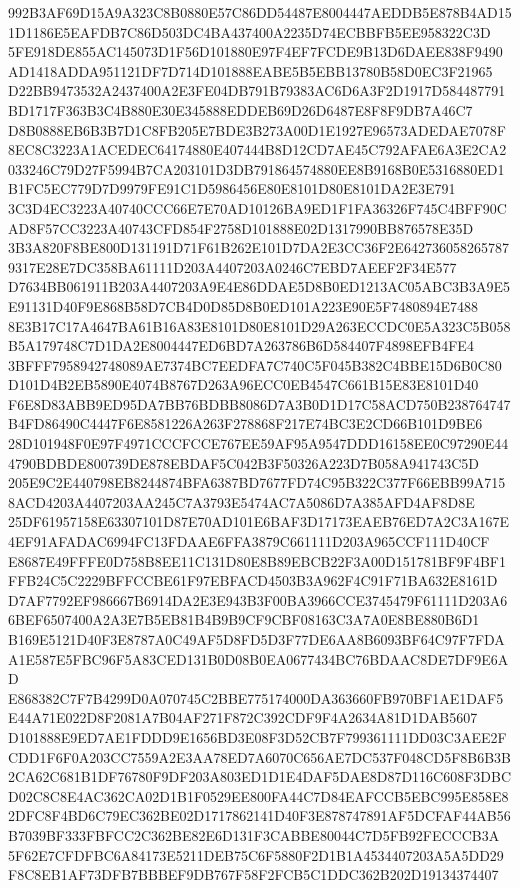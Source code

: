 \documentclass[UTF8,fontset=fandol,zihao=-4,a4paper]{ctexart}
\begin{document}
{{992B3AF69D15A9A323C8B0880E57C86DD54487E8004447AEDDB5E878B4AD151D1186E5EAFDB7C86D503DC4BA437400A2235D74ECBBFB5EE958322C3D
5FE918DE855AC145073D1F56D101880E97F4EF7FCDE9B13D6DAEE838F9490AD1418ADDA951121DF7D714D101888EABE5B5EBB13780B58D0EC3F21965
D22BB9473532A2437400A2E3FE04DB791B79383AC6D6A3F2D1917D584487791BD1717F363B3C4B880E30E345888EDDEB69D26D6487E8F8F9DB7A46C7
D8B0888EB6B3B7D1C8FB205E7BDE3B273A00D1E1927E96573ADEDAE7078F8EC8C3223A1ACEDEC64174880E407444B8D12CD7AE45C792AFAE6A3E2CA2
033246C79D27F5994B7CA203101D3DB791864574880EE8B9168B0E5316880ED1B1FC5EC779D7D9979FE91C1D5986456E80E8101D80E8101DA2E3E791
3C3D4EC3223A40740CCC66E7E70AD10126BA9ED1F1FA36326F745C4BFF90CAD8F57CC3223A40743CFD854F2758D101888E02D1317990BB876578E35D
3B3A820F8BE800D131191D71F61B262E101D7DA2E3CC36F2E6427360582657879317E28E7DC358BA61111D203A4407203A0246C7EBD7AEEF2F34E577
D7634BB061911B203A4407203A9E4E86DDAE5D8B0ED1213AC05ABC3B3A9E5E91131D40F9E868B58D7CB4D0D85D8B0ED101A223E90E5F7480894E7488
8E3B17C17A4647BA61B16A83E8101D80E8101D29A263ECCDC0E5A323C5B058B5A179748C7D1DA2E8004447ED6BD7A263786B6D584407F4898EFB4FE4
3BFFF7958942748089AE7374BC7EEDFA7C740C5F045B382C4BBE15D6B0C80D101D4B2EB5890E4074B8767D263A96ECC0EB4547C661B15E83E8101D40
F6E8D83ABB9ED95DA7BB76BDBB8086D7A3B0D1D17C58ACD750B238764747B4FD86490C4447F6E8581226A263F278868F217E74BC3E2CD66B101D9BE6
28D101948F0E97F4971CCCFCCE767EE59AF95A9547DDD16158EE0C97290E444790BDBDE800739DE878EBDAF5C042B3F50326A223D7B058A941743C5D
205E9C2E440798EB8244874BFA6387BD7677FD74C95B322C377F66EBB99A7158ACD4203A4407203AA245C7A3793E5474AC7A5086D7A385AFD4AF8D8E
25DF61957158E63307101D87E70AD101E6BAF3D17173EAEB76ED7A2C3A167E4EF91AFADAC6994FC13FDAAE6FFA3879C661111D203A965CCF111D40CF
E8687E49FFFE0D758B8EE11C131D80E8B89EBCB22F3A00D151781BF9F4BF1FFB24C5C2229BFFCCBE61F97EBFACD4503B3A962F4C91F71BA632E8161D
D7AF7792EF986667B6914DA2E3E943B3F00BA3966CCE3745479F61111D203A66BEF6507400A2A3E7B5EB81B4B9B9CF9CBF08163C3A7A0E8BE880B6D1
B169E5121D40F3E8787A0C49AF5D8FD5D3F77DE6AA8B6093BF64C97F7FDAA1E587E5FBC96F5A83CED131B0D08B0EA0677434BC76BDAAC8DE7DF9E6AD
E868382C7F7B4299D0A070745C2BBE775174000DA363660FB970BF1AE1DAF5E44A71E022D8F2081A7B04AF271F872C392CDF9F4A2634A81D1DAB5607
D101888E9ED7AE1FDDD9E1656BD3E08F3D52CB7F799361111DD03C3AEE2FCDD1F6F0A203CC7559A2E3AA78ED7A6070C656AE7DC537F048CD5F8B6B3B
2CA62C681B1DF76780F9DF203A803ED1D1E4DAF5DAE8D87D116C608F3DBCD02C8C8E4AC362CA02D1B1F0529EE800FA44C7D84EAFCCB5EBC995E858E8
2DFC8F4BD6C79EC362BE02D1717862141D40F3E878747891AF5DCFAF44AB56B7039BF333FBFCC2C362BE82E6D131F3CABBE80044C7D5FB92FECCCB3A
5F62E7CFDFBC6A84173E5211DEB75C6F5880F2D1B1A4534407203A5A5DD29F8C8EB1AF73DFB7BBBEF9DB767F58F2FCB5C1DDC362B202D19134374407
}}
\end{document}
